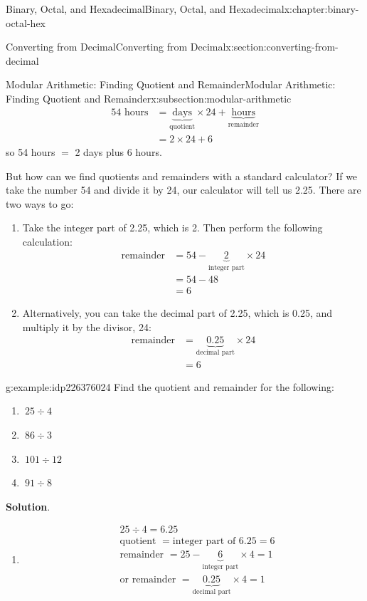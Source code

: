 \documentclass[twoside,10pt,]{book}
\newcommand{\blocktitlefont}{\relax}
\numberwithin{equation}{section}
\newcommand{\amp}{&}
\begin{document}
\begin{chapterptx}{Binary, Octal, and Hexadecimal}{}{Binary, Octal, and Hexadecimal}{}{}{x:chapter:binary-octal-hex}
\begin{sectionptx}{Converting from Decimal}{}{Converting from Decimal}{}{}{x:section:converting-from-decimal}
\begin{subsectionptx}{Modular Arithmetic: Finding Quotient and Remainder}{}{Modular Arithmetic: Finding Quotient and Remainder}{}{}{x:subsection:modular-arithmetic}
\begin{align*}
54 \text{ hours} \amp =\underbrace{\text{days}}_{\text{quotient}}\times 24+\underbrace{\text{hours}}_{\text{remainder}}\\
\amp = 2\times 24+6
\end{align*}
so 54 hours \(=\) 2 days plus 6 hours.%
\par
But how can we find quotients and remainders with a standard calculator?  If we take the number 54 and divide it by 24, our calculator will tell us 2.25.  There are two ways to go:%
\begin{enumerate}
\item{}Take the integer part of 2.25, which is 2.  Then perform the following calculation:%
\begin{align*}
\text{remainder} \amp = 54-\underbrace{2}_{\text{integer part}}\times 24\\
\amp = 54-48\\
\amp = 6
\end{align*}
%
\item{}Alternatively, you can take the decimal part of 2.25, which is 0.25, and multiply it by the divisor, 24:%
\begin{align*}
\text{remainder} \amp = \underbrace{0.25}_{\text{decimal part}}\times 24\\
\amp = 6
\end{align*}
%
\end{enumerate}
%
\begin{example}{}{g:example:idp226376024}%
Find the quotient and remainder for the following: %
\begin{enumerate}
\item{}\(\displaystyle \ 25\div 4\)%
\item{}\(\displaystyle \ 86\div 3\)%
\item{}\(\displaystyle \ 101\div 12\)%
\item{}\(\displaystyle \ 91\div 8\)%
\end{enumerate}
\par\smallskip%
\noindent\textbf{\blocktitlefont Solution}.\label{g:solution:idp226381784}{}\hypertarget{g:solution:idp226381784}{}\quad{}%
\begin{enumerate}
\item{}%
\begin{align*}
\amp 25\div 4=6.25\\
\amp \text{quotient }=\text{integer part of }6.25=6\\
\amp \text{remainder }=25-\underbrace{6}_{\text{integer part}} \times 4=1\\
\amp \text{or remainder }=\underbrace{0.25}_{\text{decimal part}}\times 4=1

\end{align*}
\end{enumerate}
\end{example}
\end{subsectionptx}
\end{sectionptx}
\end{chapterptx}
\end{document}
